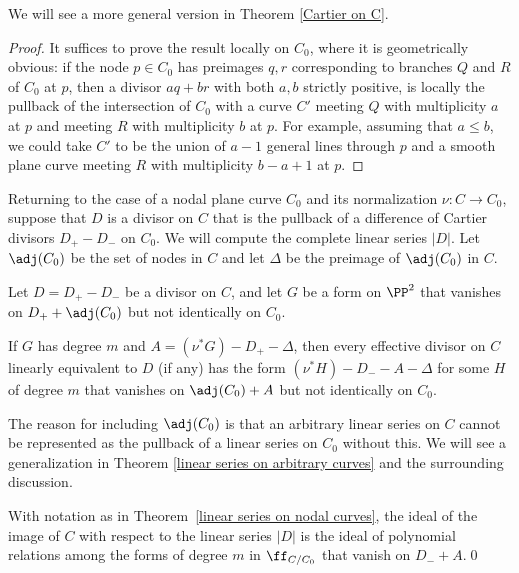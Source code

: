 We will see a more general version in Theorem \ref{Cartier on C}.

\begin{proof}
It suffices to prove the result locally on $C_{0}$, where it is
geometrically obvious:  if the node
$p\in C_{0}$ has preimages $q,r$ corresponding to  branches $Q$ and $R$ of $C_{0}$
at $p$, then
a divisor $aq+br$ with both $a,b$ strictly positive, is locally the
pullback of the intersection of $C_{0}$
with a curve $C'$ meeting $Q$ with multiplicity $a$  at $p$ and meeting $R$
with multiplicity $b$ at $p$. For example, assuming that $a\leq b$, we could take
$C'$ to be the union of $a-1$ general lines through $p$ and a smooth plane curve
meeting $R$ with multiplicity $b-a+1$ at $p$.
\end{proof}


Returning to the case of a nodal plane curve $C_{0}$ and its normalization
$\nu: C\to C_{0}$,
suppose that $D$ is a divisor on $C$ that is the pullback of a difference
of Cartier
divisors $D_{+}-D_{-}$ on $C_{0}$. We will compute the complete linear
series $|D|$.
Let $\adj(C_{0})$ be the set of nodes in $C$ and let $\Delta$ be the
preimage of $\adj(C_{0})$ in $C$.

\begin{theorem}\label{linear series on nodal curves}
Let $D = D_{+}-D_{-}$ be a divisor on $C$, and let $G$ be a form on
$\PP^{2}$
that vanishes on  $D_{+}+\adj(C_{0})$ but not identically on $C_{0}$.

If $G$ has degree $m$ and $A = (\nu^{*}G)-D_{+}-\Delta$, then every
effective divisor on
$C$ linearly equivalent to $D$ (if any) has the form
$(\nu^*H)-D_{-}-A-\Delta$ for some $H$ of degree $m$
that vanishes on $\adj(C_{0})+A$ but not identically on $C_{0}$.
\unif
\end{theorem}

The reason for including $\adj(C_{0})$ is that an arbitrary linear series on $C$
cannot be represented as the pullback of a linear series on $C_{0}$ without this.
We will see a generalization in Theorem \ref{linear series on arbitrary curves} and the surrounding discussion.

\begin{corollary}
With notation as in Theorem~\ref{linear series on nodal curves}, the
ideal of the image of
$C$ with respect to the linear series $|D|$ is the ideal of polynomial
relations among the forms
of degree $m$ in $\ff_{C/C_{0}}$ that vanish on $D_{-}+ A$.\qed
\unif
\end{corollary}

